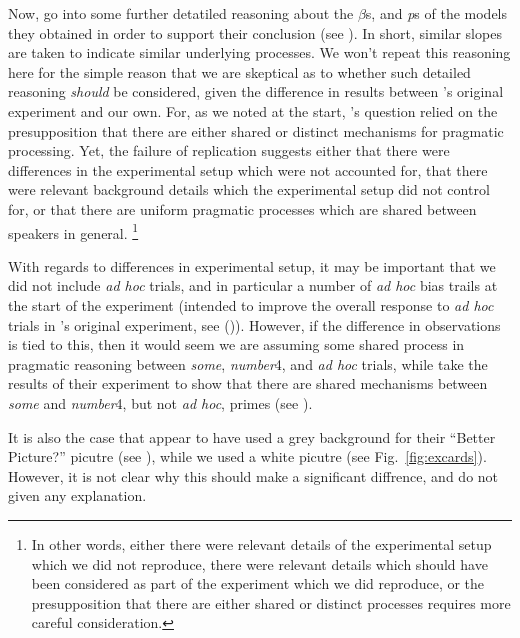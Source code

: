 \documentclass[10pt]{article}
\begin{document}
\begin{multicols}{2}
Now, \citeauthor{Bott:2016aa} go into some further detatiled reasoning about the \(\beta\)s, and \emph{p}s of the models they obtained in order to support their conclusion (see \citeyear[126,132--134]{Bott:2016aa}).
In short, similar slopes are taken to indicate similar underlying processes.
We won't repeat this reasoning here for the simple reason that we are skeptical as to whether such detailed reasoning \emph{should} be considered, given the difference in results between \citeauthor{Bott:2016aa}'s original experiment and our own.
For, as we noted at the start, \citeauthor{Bott:2016aa}'s question relied on the presupposition that there are either shared or distinct mechanisms for pragmatic processing.
Yet, the failure of replication suggests either that there were differences in the experimental setup which were not accounted for, that there were relevant background details which the experimental setup did not control for, or that there are uniform pragmatic processes which are shared between speakers in general.\nolinebreak
\footnote{In other words, either there were relevant details of the experimental setup which we did not reproduce, there were relevant details which should have been considered as part of the experiment which we did reproduce, or the presupposition that there are either shared or distinct processes requires more careful consideration.}

With regards to differences in experimental setup, it may be important that we did not include \emph{ad hoc} trials, and in particular a number of \emph{ad hoc} bias trails at the start of the experiment (intended to improve the overall response to \emph{ad hoc} trials in \citeauthor{Bott:2016aa}'s original experiment, see (\citeyear[124]{Bott:2016aa})).
However, if the difference in observations is tied to this, then it would seem we are assuming some shared process in pragmatic reasoning between \emph{some}, \emph{number}4, and \emph{ad hoc} trials, while \citeauthor{Bott:2016aa} take the results of their experiment to show that there are shared mechanisms between \emph{some} and \emph{number}4, but not \emph{ad hoc}, primes (see \citeyear[125--126]{Bott:2016aa}).

It is also the case that \citeauthor{Bott:2016aa} appear to have used a grey background for their ``Better Picture?'' picutre (see \citeyear[Fig.\ 3, 123]{Bott:2016aa}), while we used a white picutre (see Fig.\ \ref{fig:excards}).
However, it is not clear why this should make a significant diffrence, and \citeauthor{Bott:2016aa} do not given any explanation.


\end{multicols}
\end{document}
